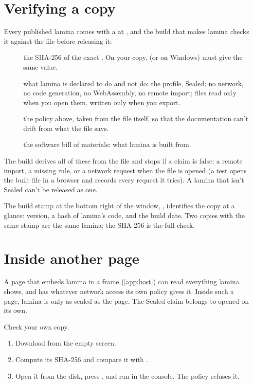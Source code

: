 \section{Verifying a copy}\label{sec:verify}

Every published lamina comes with a  at , and
the build that makes lamina checks it against the file before releasing it:

\begin{description}
\item[] the SHA-256 of the exact . On your copy,
 (or  on Windows) must give the
same value.
\item[] what lamina is declared to do and not do: the profile, Sealed; no network,
no code generation, no WebAssembly, no remote import; files read only when you open them, written only
when you export.
\item[] the policy above, taken from the file itself, so that the documentation can't
drift from what the file says.
\item[] the software bill of materials: what lamina is built from.
\end{description}

The build derives all of these from the file and stops if a claim is false: a remote import, a missing
rule, or a network request when the file is opened (a test opens the built file in a browser and records
every request it tries). A lamina that isn't Sealed can't be released as one.

The build stamp at the bottom right of the window, , identifies the
copy at a glance: version, a hash of lamina's code, and the build date. Two copies with the same stamp are
the same lamina; the SHA-256 is the full check.

\section{Inside another page}

A page that embeds lamina in a frame (\cref{app:host}) can read everything lamina shows, and has whatever
network access its own policy gives it. Inside such a page, lamina is only as sealed as the page. The
Sealed claim belongs to  opened on its own.

\begin{tryit}
Check your own copy.
\begin{enumerate}
\item Download  from the empty screen.
\item Compute its SHA-256 and compare it with .
\item Open it from the disk, press , and run  in the console.
The policy refuses it.
\end{enumerate}
\end{tryit}
